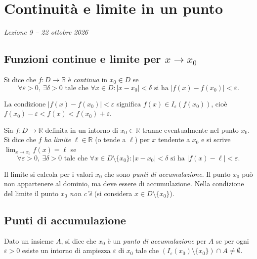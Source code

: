 \documentclass[11pt,a4paper]{article}
\begin{document}
\section[Continuità e limite in un punto (Lezione 9 -- 22 ottobre 2026)]{Continuità e limite in un punto}
\noindent\emph{Lezione 9 -- 22 ottobre 2026}
\subsection{Funzioni continue e limite per $x \to x_0$}

\begin{definizione}
Si dice che $f : D \to \mathbb{R}$ è \emph{continua} in $x_0 \in D$ se
\[
\forall \varepsilon > 0,\ \exists \delta > 0 \text{ tale che } \forall x \in D : |x - x_0| < \delta \text{ si ha } |f(x) - f(x_0)| < \varepsilon .
\]
\end{definizione}

La condizione $|f(x) - f(x_0)| < \varepsilon$ significa $f(x) \in I_\varepsilon(f(x_0))$, cioè $f(x_0) - \varepsilon < f(x) < f(x_0) + \varepsilon$.

\begin{definizione}
Sia $f : D \to \mathbb{R}$ definita in un intorno di $x_0 \in \mathbb{R}$ tranne eventualmente nel punto $x_0$. Si dice che $f$ \emph{ha limite} $\ell \in \mathbb{R}$ (o tende a $\ell$) per $x$ tendente a $x_0$ e si scrive $\displaystyle\lim_{x \to x_0} f(x) = \ell$ se
\[
\forall \varepsilon > 0,\ \exists \delta > 0 \text{ tale che } \forall x \in D \setminus \{x_0\} : |x - x_0| < \delta \text{ si ha } |f(x) - \ell| < \varepsilon .
\]
\end{definizione}

\begin{osservazione}
Il limite si calcola per i valori $x_0$ che sono \emph{punti di accumulazione}. Il punto $x_0$ può non appartenere al dominio, ma deve essere di accumulazione. Nella condizione del limite il punto $x_0$ \emph{non c'è} (si considera $x \in D \setminus \{x_0\}$).
\end{osservazione}

\subsection{Punti di accumulazione}

\begin{definizione}
Dato un insieme $A$, si dice che $x_0$ è un \emph{punto di accumulazione} per $A$ se per ogni $\varepsilon > 0$ esiste un intorno di ampiezza $\varepsilon$ di $x_0$ tale che $(I_\varepsilon(x_0) \setminus \{x_0\}) \cap A \neq \emptyset$.
\end{definizione}
\end{document}
